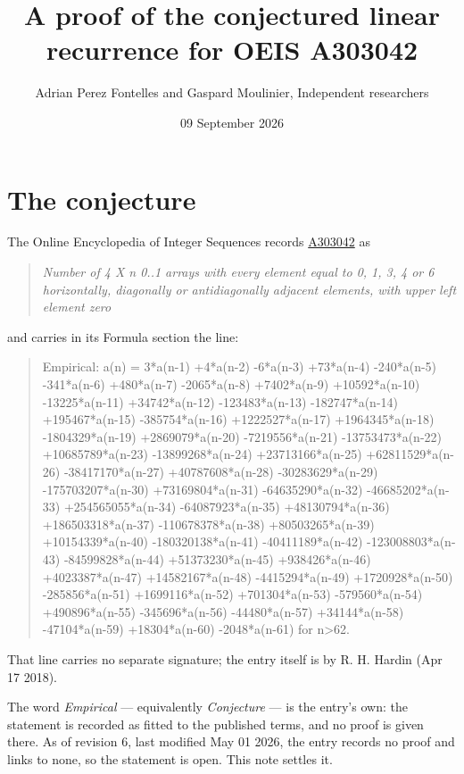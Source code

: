 \documentclass[11pt]{article}
\title{A proof of the conjectured linear recurrence for OEIS A303042}
\author{Adrian Perez Fontelles and Gaspard Moulinier, Independent researchers}
\date{09 September 2026}
\theoremstyle{definition}
\begin{document}
\maketitle
\section{The conjecture}

The Online Encyclopedia of Integer Sequences records \href{https://oeis.org/A303042}{A303042} as

\begin{quote}\itshape Number of 4 X n 0..1 arrays with every element equal to 0, 1, 3, 4 or 6 horizontally, diagonally or antidiagonally adjacent elements, with upper left element zero\end{quote}

and carries in its Formula section the line:

\begin{quote}\ttfamily Empirical: a(n) = 3*a(n-1) +4*a(n-2) -6*a(n-3) +73*a(n-4) -240*a(n-5) -341*a(n-6) +480*a(n-7) -2065*a(n-8) +7402*a(n-9) +10592*a(n-10) -13225*a(n-11) +34742*a(n-12) -123483*a(n-13) -182747*a(n-14) +195467*a(n-15) -385754*a(n-16) +1222527*a(n-17) +1964345*a(n-18) -1804329*a(n-19) +2869079*a(n-20) -7219556*a(n-21) -13753473*a(n-22) +10685789*a(n-23) -13899268*a(n-24) +23713166*a(n-25) +62811529*a(n-26) -38417170*a(n-27) +40787608*a(n-28) -30283629*a(n-29) -175703207*a(n-30) +73169804*a(n-31) -64635290*a(n-32) -46685202*a(n-33) +254565055*a(n-34) -64087923*a(n-35) +48130794*a(n-36) +186503318*a(n-37) -110678378*a(n-38) +80503265*a(n-39) +10154339*a(n-40) -180320138*a(n-41) -40411189*a(n-42) -123008803*a(n-43) -84599828*a(n-44) +51373230*a(n-45) +938426*a(n-46) +4023387*a(n-47) +14582167*a(n-48) -4415294*a(n-49) +1720928*a(n-50) -285856*a(n-51) +1699116*a(n-52) +701304*a(n-53) -579560*a(n-54) +490896*a(n-55) -345696*a(n-56) -44480*a(n-57) +34144*a(n-58) -47104*a(n-59) +18304*a(n-60) -2048*a(n-61) for n>62.\end{quote}

That line carries no separate signature; the entry itself is by R. H. Hardin (Apr 17 2018).

The word {\itshape Empirical} --- equivalently {\itshape Conjecture} --- is the entry's own: the statement is recorded as fitted to the published terms, and no proof is given there. As of revision 6, last modified May 01 2026, the entry records no proof and links to none, so the statement is open. This note settles it.
\end{document}
